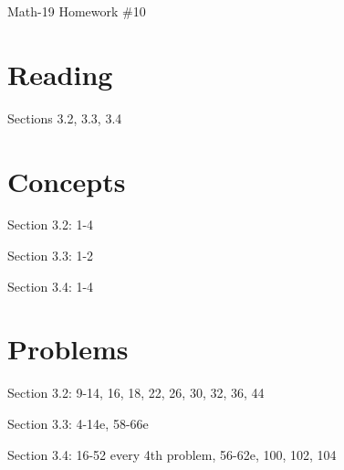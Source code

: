 \documentclass[letterpaper,12pt,fleqn]{article}
\begin{document}
\begin{center}
\Large Math-19 Homework \#10
\end{center}

\section*{Reading}

Sections 3.2, 3.3, 3.4

\section*{Concepts}

Section 3.2: 1-4

Section 3.3: 1-2

Section 3.4: 1-4

\section*{Problems}

Section 3.2: 9-14, 16, 18, 22, 26, 30, 32, 36, 44

Section 3.3: 4-14e, 58-66e

Section 3.4: 16-52 every 4th problem, 56-62e, 100, 102, 104
\end{document}
